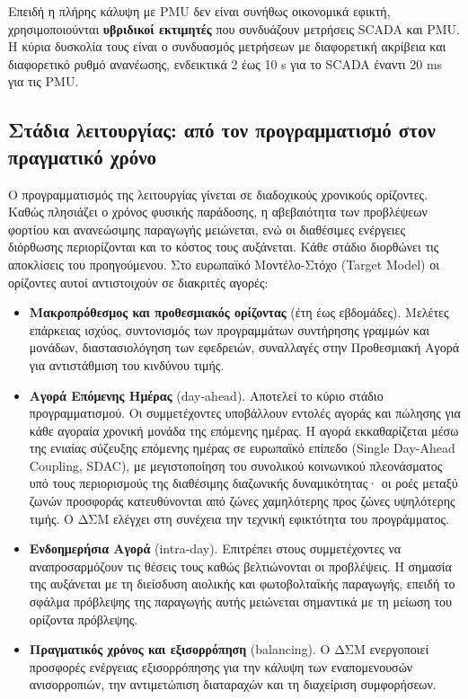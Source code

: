 Επειδή η πλήρης κάλυψη με PMU δεν είναι συνήθως οικονομικά εφικτή, χρησιμοποιούνται
\textbf{υβριδικοί εκτιμητές} που συνδυάζουν μετρήσεις SCADA και PMU. Η κύρια δυσκολία τους
είναι ο συνδυασμός μετρήσεων με διαφορετική ακρίβεια και διαφορετικό ρυθμό ανανέωσης,
ενδεικτικά 2 έως 10 s για το SCADA έναντι 20 ms για τις PMU.

\subsection{Στάδια λειτουργίας: από τον προγραμματισμό στον πραγματικό χρόνο}

Ο προγραμματισμός της λειτουργίας γίνεται σε διαδοχικούς χρονικούς ορίζοντες. Καθώς
πλησιάζει ο χρόνος φυσικής παράδοσης, η αβεβαιότητα των προβλέψεων φορτίου και ανανεώσιμης
παραγωγής μειώνεται, ενώ οι διαθέσιμες ενέργειες διόρθωσης περιορίζονται και το κόστος τους
αυξάνεται. Κάθε στάδιο διορθώνει τις αποκλίσεις του προηγούμενου. Στο ευρωπαϊκό
Μοντέλο-Στόχο (Target Model) οι ορίζοντες αυτοί αντιστοιχούν σε διακριτές αγορές:

\begin{itemize}
\item \textbf{Μακροπρόθεσμος και προθεσμιακός ορίζοντας} (έτη έως εβδομάδες). Μελέτες
      επάρκειας ισχύος, συντονισμός των προγραμμάτων συντήρησης γραμμών και μονάδων,
      διαστασιολόγηση των εφεδρειών, συναλλαγές στην Προθεσμιακή Αγορά για αντιστάθμιση
      του κινδύνου τιμής.
\item \textbf{Αγορά Επόμενης Ημέρας} (day-ahead). Αποτελεί το κύριο στάδιο
      προγραμματισμού. Οι συμμετέχοντες υποβάλλουν εντολές αγοράς και πώλησης για κάθε
      αγοραία χρονική μονάδα της επόμενης ημέρας. Η αγορά εκκαθαρίζεται μέσω της ενιαίας
      σύζευξης επόμενης ημέρας σε ευρωπαϊκό επίπεδο (Single Day-Ahead Coupling, SDAC), με
      μεγιστοποίηση του συνολικού κοινωνικού πλεονάσματος υπό τους περιορισμούς της
      διαθέσιμης διαζωνικής δυναμικότητας· οι ροές μεταξύ ζωνών προσφοράς κατευθύνονται
      από ζώνες χαμηλότερης προς ζώνες υψηλότερης τιμής. Ο ΔΣΜ ελέγχει στη συνέχεια την
      τεχνική εφικτότητα του προγράμματος.
\item \textbf{Ενδοημερήσια Αγορά} (intra-day). Επιτρέπει στους συμμετέχοντες να
      αναπροσαρμόζουν τις θέσεις τους καθώς βελτιώνονται οι προβλέψεις. Η σημασία της
      αυξάνεται με τη διείσδυση αιολικής και φωτοβολταϊκής παραγωγής, επειδή το σφάλμα
      πρόβλεψης της παραγωγής αυτής μειώνεται σημαντικά με τη μείωση του ορίζοντα
      πρόβλεψης.
\item \textbf{Πραγματικός χρόνος και εξισορρόπηση} (balancing). Ο ΔΣΜ ενεργοποιεί προσφορές
      ενέργειας εξισορρόπησης για την κάλυψη των εναπομενουσών ανισορροπιών, την
      αντιμετώπιση διαταραχών και τη διαχείριση συμφορήσεων.
\end{itemize}

